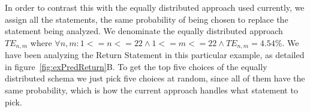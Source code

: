 \documentclass[conference]{IEEEtran}
\begin{document}

In order to contrast this with the equally distributed approach used currently, 
we assign all the statements, the same probability of being chosen to replace 
the statement being analyzed. We denominate the equally distributed approach 
$TE_{n,m}$ where $\forall n,m: 1<=n<=22 \land 1<=m<=22 \land TE_{n,m} = 4.54\%$. 
We have been analyzing the Return Statement in this particular example, as 
detailed in figure~\ref{fig:exPredReturn}B. To get the top five choices of the 
equally distributed schema we just pick five choices at random, since all of 
them have the same probability, which is how the current approach handles what 
statement to pick.


\end{document}
